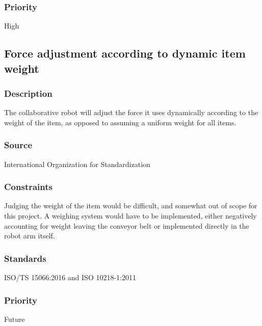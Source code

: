 \subsubsection{Priority}
High


\subsection{Force adjustment according to dynamic item weight}
\subsubsection{Description}
The collaborative robot will adjust the force it uses dynamically according to the weight of the item, as opposed to assuming a uniform weight for all items.
\subsubsection{Source}
International Organization for Standardization
\subsubsection{Constraints}
Judging the weight of the item would be difficult, and somewhat out of scope for this project. A weighing system would have to be implemented, either negatively accounting for weight leaving the conveyor belt or implemented directly in the robot arm itself.
\subsubsection{Standards}
ISO/TS 15066:2016 and ISO 10218-1:2011
\subsubsection{Priority}
Future
